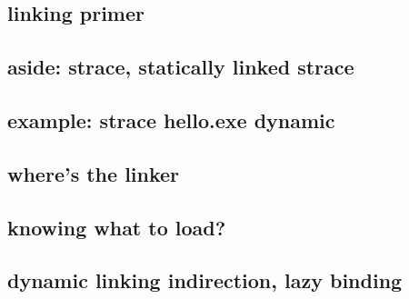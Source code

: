 \subsection{linking primer}


\subsection{aside: strace, statically linked strace}



\subsection{example: strace hello.exe dynamic}



\subsection{where's the linker}



\subsection{knowing what to load?}



\subsection{dynamic linking indirection, lazy binding}



